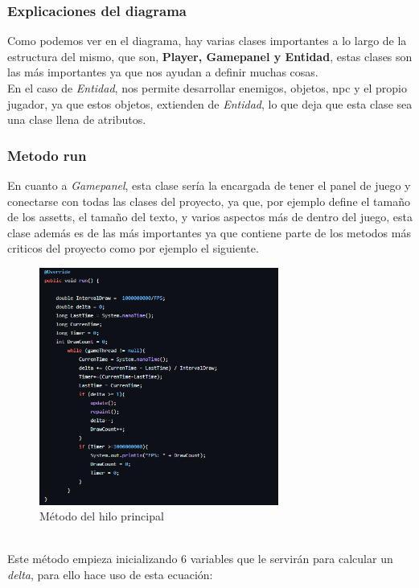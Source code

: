 \documentclass[a4paper]{article}
\begin{document}
\subsubsection{Explicaciones del diagrama}
Como podemos ver en el diagrama, hay varias clases importantes a lo largo de la estructura del mismo, que son, \textbf{Player, Gamepanel y Entidad}, estas clases son las más importantes ya que
nos ayudan a definir muchas cosas.\\
En el caso de \textit{Entidad}, nos permite desarrollar enemigos, objetos, npc y el propio jugador, ya que estos objetos, extienden de \textit{Entidad}, lo que deja que esta clase sea una clase llena de atributos.
\subsubsection{Metodo run}
En cuanto a \textit{Gamepanel}, esta clase sería la encargada de tener el panel de juego y conectarse con todas las clases del proyecto, ya que, por ejemplo define
el tamaño de los assetts, el tamaño del texto, y varios aspectos más de dentro del juego, esta clase además es de las más importantes ya que contiene parte de los metodos más criticos del proyecto como por ejemplo el siguiente.\\
\begin{figure}[ht]
    \centering
    \includegraphics[width=0.7\textwidth]{Images/fpsMethod.PNG}
    \caption{Método del hilo principal}
    \label{fig:metodos}
\end{figure}
\\
Este método empieza inicializando 6 variables que le servirán para calcular un \textit{delta}, para ello hace uso de esta ecuación:
\end{document}
